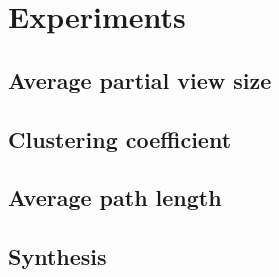 
\section{Experiments}
\label{sec:experiments}

\subsection{Average partial view size}

\subsection{Clustering coefficient}

\subsection{Average path length}

\subsection{Synthesis}

